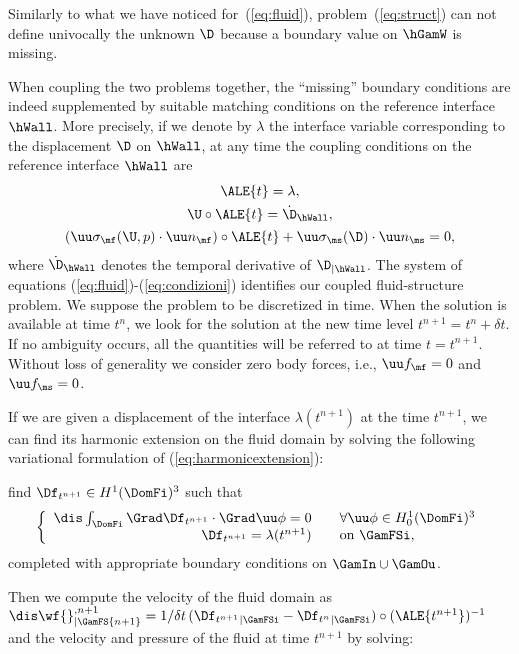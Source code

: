 Similarly to what we have noticed for~(\ref{eq:fluid}),
problem~(\ref{eq:struct}) can not define univocally the unknown
$\D$ because a boundary value on $\hGamW$ is missing.

When coupling the two problems together, the ``missing'' boundary
conditions are indeed supplemented by suitable matching
conditions on the reference interface $\hWall$. More precisely,
if we denote by $\lambda$ the interface variable corresponding to
the displacement $\D$ on $\hWall$, at any time the coupling
conditions on the reference interface $\hWall$ are
\begin{equation}\label{eq:condizioni}
\begin{array}{c}
  \ALE{t} = \lambda ,\\[4pt]
  \U \circ \ALE{t} = \dot{\D}_{\hWall} ,\\[4pt]
  (\uu \sigma_\mf(\U,p) \cdot {\uu n}_\mf) \circ \ALE{t} +
  \uu \sigma_\ms(\D)\cdot {\uu n}_\ms =0,
\end{array}
\end{equation}
where $\dot{\D}_{\hWall}$ denotes the temporal derivative of
$\D_{\vert\hWall}$. The system of equations (\ref{eq:fluid})-(\ref{eq:condizioni})
identifies our coupled fluid-structure problem.
We suppose the problem to be discretized in time. When the
solution is available at time $t^n$, we look for the solution at
the new time level $t^{n+1} = t^n + \delta t$. If no ambiguity
occurs,  all the quantities will be referred to at time
$t=t^{n+1}$.
Without loss of generality we consider zero body forces, i.e.,
$\uu f_\mf =0$ and $\uu f_\ms=0$.

If we are given a displacement of the interface  $\lambda(t^{n+1})$ at the
time $t^{n+1}$, we can find its harmonic extension on the fluid domain by solving
the  following variational formulation of
(\ref{eq:harmonicextension}):

find $\Df_{t^{n+1}} \in H^1(\DomFi)^3$ such that
\begin{equation} \label{eq:variationalvelocity2}
\left\{
\begin{array}{rcl}
\dis \int_{\DomFi} \Grad \Df_{t^{n+1}}\cdot \Grad \uu \phi  =  0 & & \forall \uu \phi \in H^1_0(\DomFi)^3\\
\Df_{t^{n+1}} = \lambda({t^{n+1}}) & & \text{on } \GamFSi,
\end{array}
\right.
\end{equation}
completed with appropriate boundary conditions  on $\GamIn\cup\GamOu$.

Then we compute the velocity of the fluid domain as 
$\dis \wf{}^{,n+1}_{|\GamFS{n+1}} = 1/\delta t\,(\Df_{t^{n+1}}{}_{|\GamFSi} - \Df_{t^n}{}_{|\GamFSi})
\circ(\ALE {t^{n+1}})^{-1}$ and the velocity and pressure of the fluid at time
$t^{n+1}$ by solving:

